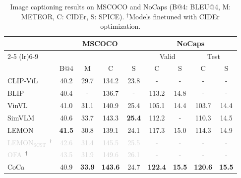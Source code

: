 \begin{table}[t]
\centering
\vspace{-1em}
\begin{tabular}{@{}lcccccccc@{}}
    \toprule 
    & \multicolumn{4}{c}{MSCOCO} & \multicolumn{4}{c}{NoCaps} \\
    \cmidrule(lr){2-5} \cmidrule(lr){6-9}
    &  &  &  &  & \multicolumn{2}{c}{Valid} & \multicolumn{2}{c}{Test} \\
    & B@4 & M & C & S & C & S & C & S \\
    \midrule
    CLIP-ViL~\cite{shen2021much} & 40.2 & 29.7 & 134.2 & 23.8 & - & - & - & - \\
    BLIP~\cite{li2022blip} & 40.4 & - & 136.7 & - & 113.2 & 14.8 & - & - \\
    VinVL\cite{Zhang_2021_CVPR} & 41.0 & 31.1 & 140.9 & 25.4 & 105.1 & 14.4 & 103.7 & 14.4 \\
    SimVLM~\cite{wang2021simvlm} & 40.6 & 33.7 & 143.3 & \bf 25.4 & 112.2 & - & 110.3 & 14.5 \\
    LEMON~\cite{hu2021scaling} & \bf 41.5 & 30.8 & 139.1 & 24.1 & 117.3 & 15.0 & 114.3 & 14.9 \\
    \textcolor{lightgray}{LEMON$_{\text{SCST}}$~\cite{hu2021scaling}}$^{\dagger}$ & \textcolor{lightgray}{42.6} & \textcolor{lightgray}{31.4} & \textcolor{lightgray}{145.5} & \textcolor{lightgray}{25.5} & \textcolor{lightgray}{-} & \textcolor{lightgray}{-} & \textcolor{lightgray}{-} & \textcolor{lightgray}{-}\\
    \textcolor{lightgray}{OFA~\cite{wang2022unifying}}$^{\dagger}$ & \textcolor{lightgray}{43.5} & \textcolor{lightgray}{31.9} & \textcolor{lightgray}{149.6} & \textcolor{lightgray}{26.1} & \textcolor{lightgray}{-} & \textcolor{lightgray}{-} & \textcolor{lightgray}{-} & \textcolor{lightgray}{-}\\
    \midrule
    CoCa & 40.9 & \bf 33.9 & \bf 143.6 & 24.7 & \bf 122.4 & \bf 15.5 & \bf 120.6 & \bf 15.5\\
    \bottomrule
\end{tabular}
\caption{\label{tabs:caption} Image captioning results on MSCOCO and NoCaps (B@4: BLEU@4, M: METEOR, C: CIDEr, S: SPICE). $^{\dagger}$Models finetuned with CIDEr optimization. }
\end{table}